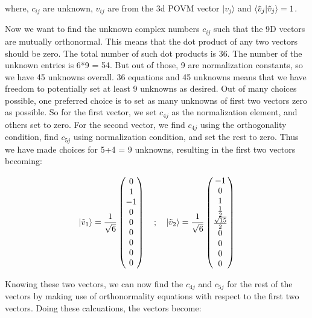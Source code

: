 \documentclass{article}
\begin{document}
where, $c_{ij}$ are unknown, $v_{ij}$ are from the 3d POVM vector $|v_j\rangle$ and $\langle \Tilde{v}_{j}|\Tilde{v}_{j}\rangle = 1$.


Now we want to find the unknown complex numbers $c_{ij}$ such that the 9D vectors are mutually orthonormal. 
This means that the dot product of any two vectors should be zero. The total number of such dot products is 36. 
The number of the unknown entries is 6*9 = 54. But out of those, 9 are normalization constants, so we have 45 unknowns overall. 
36 equations and 45 unknowns means that we have freedom to potentially set at least 9 unknowns as desired. Out of many choices possible, one 
preferred choice is to set as many unknowns of first two vectors zero as possible. So for the first vector, we set $c_{4j}$ as the normalization 
element, and others set to zero. For the second vector, we find $c_{4j}$ using the orthogonality condition, find $c_{5j}$ using normalization condition, 
and set the rest to zero. Thus we have made choices for 5+4 = 9 unknowns, resulting in the first two vectors becoming:



\begin{equation}
    |\Tilde{v}_{1}\rangle = \frac{1}{\sqrt{6}} \begin{pmatrix}
0 \\ 1 \\ -1 \\ 0 \\ 0 \\ 0 \\ 0 \\ 0 \\ 0
\end{pmatrix} \quad ; \quad 
|\Tilde{v}_{2}\rangle = \frac{1}{\sqrt{6}} \begin{pmatrix}
    -1 \\ 0 \\ 1 \\ \frac{1}{2} \\ \frac{\sqrt{15}}{2} \\ 0 \\ 0 \\ 0 \\ 0
\end{pmatrix}
\end{equation}


Knowing these two vectors, we can now find the $c_{4j}$ and $c_{5j}$ for the rest of the
vectors by making use of orthonormality equations with respect to the first two vectors. Doing these calcuations, the vectors become:
\end{document}
